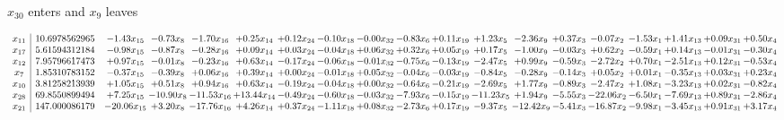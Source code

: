\documentclass[9pt]{article}
\begin{document}
 $ x_{30} $ enters and $ x_{9} $ leaves 

 \[\begin{array}{c| c c@{\hskip 2pt} c@{\hskip 2pt} c@{\hskip 2pt} c@{\hskip 2pt} c@{\hskip 2pt} c@{\hskip 2pt} c@{\hskip 2pt} c@{\hskip 2pt} c@{\hskip 2pt} c@{\hskip 2pt} c@{\hskip 2pt} c@{\hskip 2pt} c@{\hskip 2pt} c@{\hskip 2pt} c@{\hskip 2pt} c@{\hskip 2pt} c@{\hskip 2pt} }
 x_{11}   &  10.6978562965 & -1.43 x_{15} & -0.73 x_{8} & -1.70 x_{16} & +  0.25 x_{14} & +  0.12 x_{24} & -0.10 x_{18} & -0.00 x_{32} & -0.83 x_{6} & +  0.11 x_{19} & +  1.23 x_{5} & -2.36 x_{9} & +  0.37 x_{3} & -0.07 x_{2} & -1.53 x_{1} & +  1.41 x_{13} & +  0.09 x_{31} & +  0.50 x_{4}\\
 x_{17}   &  5.61594312184 & -0.98 x_{15} & -0.87 x_{8} & -0.28 x_{16} & +  0.09 x_{14} & +  0.03 x_{24} & -0.04 x_{18} & +  0.06 x_{32} & +  0.32 x_{6} & +  0.05 x_{19} & +  0.17 x_{5} & -1.00 x_{9} & -0.03 x_{3} & +  0.62 x_{2} & -0.59 x_{1} & +  0.14 x_{13} & -0.01 x_{31} & -0.30 x_{4}\\
 x_{12}   &  7.95796617473 & +  0.97 x_{15} & -0.01 x_{8} & -0.23 x_{16} & +  0.63 x_{14} & -0.17 x_{24} & -0.06 x_{18} & -0.01 x_{32} & -0.75 x_{6} & -0.13 x_{19} & -2.47 x_{5} & +  0.99 x_{9} & -0.59 x_{3} & -2.72 x_{2} & +  0.70 x_{1} & -2.51 x_{13} & +  0.12 x_{31} & -0.53 x_{4}\\
 x_{7}   &  1.85310783152 & -0.37 x_{15} & -0.39 x_{8} & +  0.06 x_{16} & +  0.39 x_{14} & +  0.00 x_{24} & -0.01 x_{18} & +  0.05 x_{32} & -0.04 x_{6} & -0.03 x_{19} & -0.84 x_{5} & -0.28 x_{9} & -0.14 x_{3} & +  0.05 x_{2} & +  0.01 x_{1} & -0.35 x_{13} & +  0.03 x_{31} & +  0.23 x_{4}\\
 x_{10}   &  3.81258213939 & +  1.05 x_{15} & +  0.51 x_{8} & +  0.94 x_{16} & +  0.63 x_{14} & -0.19 x_{24} & -0.04 x_{18} & +  0.00 x_{32} & -0.64 x_{6} & -0.21 x_{19} & -2.69 x_{5} & +  1.77 x_{9} & -0.89 x_{3} & -2.47 x_{2} & +  1.08 x_{1} & -3.23 x_{13} & +  0.02 x_{31} & -0.82 x_{4}\\
 x_{28}   &  69.8550899494 & +  7.25 x_{15} & -10.90 x_{8} & -11.53 x_{16} & + 13.44 x_{14} & -0.49 x_{24} & -0.60 x_{18} & -0.03 x_{32} & -7.93 x_{6} & -0.15 x_{19} & -11.23 x_{5} & +  1.94 x_{9} & -5.55 x_{3} & -22.06 x_{2} & -6.50 x_{1} & -7.69 x_{13} & +  0.89 x_{31} & -2.86 x_{4}\\
 x_{21}   &  147.000086179 & -20.06 x_{15} & +  3.20 x_{8} & -17.76 x_{16} & +  4.26 x_{14} & +  0.37 x_{24} & -1.11 x_{18} & +  0.08 x_{32} & -2.73 x_{6} & +  0.17 x_{19} & -9.37 x_{5} & -12.42 x_{9} & -5.41 x_{3} & -16.87 x_{2} & -9.98 x_{1} & -3.45 x_{13} & +  0.91 x_{31} & +  3.17 x_{4}\\

\end{array}\]
\end{document}
